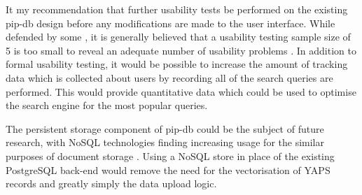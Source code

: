 It my recommendation that further usability tests be performed on the
existing pip-db design before any modifications are made to the user
interface. While defended by some \cite{nielsen2000you}, it is
generally believed that a usability testing sample size of 5 is too
small to reveal an adequate number of usability problems
\cite{spool2001testing, woolrych2001and}. In addition to formal
usability testing, it would be possible to increase the amount of
tracking data which is collected about users by recording all of the
search queries are performed. This would provide quantitative data
which could be used to optimise the search engine for the most popular
queries.

The persistent storage component of pip-db could be the subject of
future research, with NoSQL technologies finding increasing usage for
the similar purposes of document storage \cite{tudorica2011comparison,
  mongo2014leading, hecht2011nosql, mongo2013top5}. Using a NoSQL
store in place of the existing PostgreSQL back-end would remove the
need for the vectorisation of YAPS records and greatly simply the data
upload logic.
